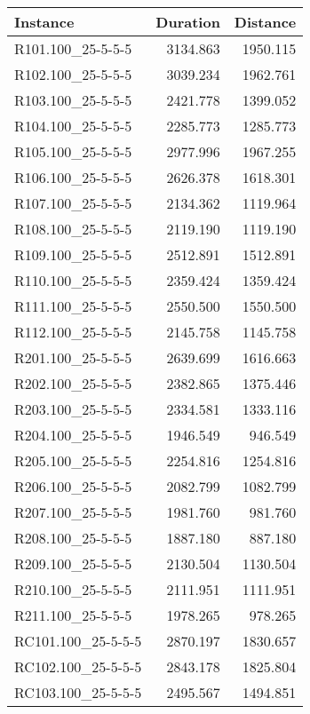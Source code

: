 \begin{table}
\begin{tabular}{lrr}
\hline
 \textbf{Instance} & \textbf{Duration} & \textbf{Distance} \\
\hline
R101.100_25-5-5-5 &     3134.863 &     1950.115 \\ 
R102.100_25-5-5-5 &     3039.234 &     1962.761 \\ 
R103.100_25-5-5-5 &     2421.778 &     1399.052 \\ 
R104.100_25-5-5-5 &     2285.773 &     1285.773 \\ 
R105.100_25-5-5-5 &     2977.996 &     1967.255 \\ 
R106.100_25-5-5-5 &     2626.378 &     1618.301 \\ 
R107.100_25-5-5-5 &     2134.362 &     1119.964 \\ 
R108.100_25-5-5-5 &     2119.190 &     1119.190 \\ 
R109.100_25-5-5-5 &     2512.891 &     1512.891 \\ 
R110.100_25-5-5-5 &     2359.424 &     1359.424 \\ 
R111.100_25-5-5-5 &     2550.500 &     1550.500 \\ 
R112.100_25-5-5-5 &     2145.758 &     1145.758 \\ 
R201.100_25-5-5-5 &     2639.699 &     1616.663 \\ 
R202.100_25-5-5-5 &     2382.865 &     1375.446 \\ 
R203.100_25-5-5-5 &     2334.581 &     1333.116 \\ 
R204.100_25-5-5-5 &     1946.549 &      946.549 \\ 
R205.100_25-5-5-5 &     2254.816 &     1254.816 \\ 
R206.100_25-5-5-5 &     2082.799 &     1082.799 \\ 
R207.100_25-5-5-5 &     1981.760 &      981.760 \\ 
R208.100_25-5-5-5 &     1887.180 &      887.180 \\ 
R209.100_25-5-5-5 &     2130.504 &     1130.504 \\ 
R210.100_25-5-5-5 &     2111.951 &     1111.951 \\ 
R211.100_25-5-5-5 &     1978.265 &      978.265 \\ 
RC101.100_25-5-5-5 &     2870.197 &     1830.657 \\ 
RC102.100_25-5-5-5 &     2843.178 &     1825.804 \\ 
RC103.100_25-5-5-5 &     2495.567 &     1494.851 \\ 

\end{tabular}
\end{table}
